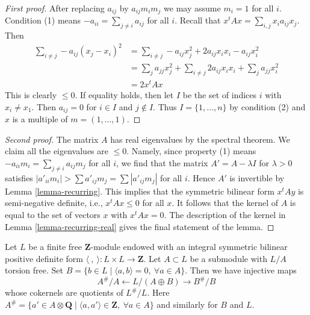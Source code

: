 \begin{proof}[First proof]
After replacing $a_{ij}$ by $a_{ij}m_im_j$ we may assume $m_i = 1$
for all $i$. Condition (1) means $-a_{ii} = \sum_{j \not = i} a_{ij}$
for all $i$. Recall that $x^tAx = \sum_{i, j} x_ia_{ij}x_j$.
Then
\begin{align*}
\sum\nolimits_{i \not = j} -a_{ij}(x_j - x_i)^2 & =
\sum\nolimits_{i \not = j} -a_{ij}x_j^2 + 2a_{ij}x_ix_i - a_{ij}x_i^2 \\
& =
\sum\nolimits_j a_{jj} x_j^2 +
\sum\nolimits_{i \not = j} 2a_{ij}x_ix_i +
\sum\nolimits_j a_{jj} x_i^2 \\
& = 2x^tAx
\end{align*}
This is clearly $\leq 0$. If equality holds, then let $I$ be the set
of indices $i$ with $x_i \not = x_1$. Then $a_{ij} = 0$ for $i \in I$
and $j \not \in I$. Thus $I = \{1, \ldots, n\}$ by condition (2) and
$x$ is a multiple of $m = (1, \ldots, 1)$.
\end{proof}

\begin{proof}[Second proof]
The matrix $A$ has real eigenvalues by the spectral theorem.
We claim all the eigenvalues are $\leq 0$.
Namely, since property (1) means
$-a_{ii}m_i = \sum_{j \not = i} a_{ij}m_j$ for all $i$,
we find that the matrix $A' = A - \lambda I$ for $\lambda > 0$
satisfies $|a'_{ii}m_i| > \sum a'_{ij}m_j = \sum |a'_{ij}m_j|$ for all $i$.
Hence $A'$ is invertible by Lemma \ref{lemma-recurring}.
This implies that the symmetric bilinear form $x^tAy$
is semi-negative definite, i.e., $x^tAx \leq 0$ for all $x$.
It follows that the kernel of $A$ is equal
to the set of vectors $x$ with $x^tAx = 0$.
The description of the kernel in Lemma \ref{lemma-recurring-real}
gives the final statement of the lemma.
\end{proof}

\begin{lemma}
\label{lemma-orthogonal-direct-sum}
Let $L$ be a finite free $\mathbf{Z}$-module endowed
with an integral symmetric bilinear positive definite
form $\langle\ ,\ \rangle : L \times L \to \mathbf{Z}$.
Let $A \subset L$ be a submodule with $L/A$ torsion free. Set
$B = \{b \in L \mid \langle a, b\rangle = 0,\ \forall a \in A\}$.
Then we have injective maps
$$
A^\#/A \leftarrow L/(A \oplus B) \rightarrow B^\#/B
$$
whose cokernels are quotients of $L^\#/L$. Here
$A^\# = \{a' \in A \otimes \mathbf{Q} \mid
\langle a, a'\rangle \in \mathbf{Z},\ \forall a \in A\}$
and similarly for $B$ and $L$.
\end{lemma}

